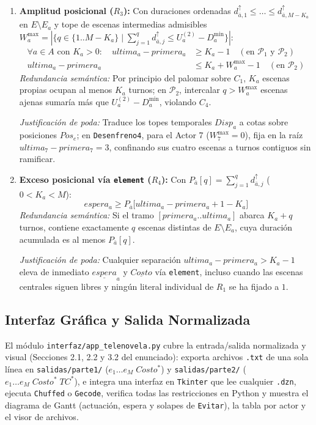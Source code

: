 \begin{enumerate}
    \item \textbf{Amplitud posicional ($R_3$):} Con duraciones ordenadas $d^{\uparrow}_{\bar{a}, 1} \le \dots \le d^{\uparrow}_{\bar{a}, M-K_a}$ en $E \setminus E_a$ y tope de escenas intermedias admisibles $W^{\max}_a = |\{q \in \{1..M-K_a\} \mid \sum_{j=1}^q d^{\uparrow}_{\bar{a}, j} \le U^{(2)}_a - D^{\min}_a\}|$:
    \begin{align}
        \forall a \in A \text{ con } K_a > 0: \quad
        ultima_a - primera_a &\ge K_a - 1 \quad (\text{en } \mathcal{P}_1 \text{ y } \mathcal{P}_2) \label{eq:r3_inf} \\
        ultima_a - primera_a &\le K_a + W^{\max}_a - 1 \quad (\text{en } \mathcal{P}_2) \label{eq:r3_amplitud}
    \end{align}
    \emph{Redundancia semántica:} Por principio del palomar sobre $C_1$, $K_a$ escenas propias ocupan al menos $K_a$ turnos; en $\mathcal{P}_2$, intercalar $q > W^{\max}_a$ escenas ajenas sumaría más que $U^{(2)}_a - D^{\min}_a$, violando $C_4$.\par
    \emph{Justificación de poda:} Traduce los topes temporales $Disp_a$ a cotas sobre posiciones $Pos_e$; en \texttt{Desenfreno4}, para el Actor 7 ($W^{\max}_7 = 0$), fija en la raíz $ultima_7 - primera_7 = 3$, confinando sus cuatro escenas a turnos contiguos sin ramificar.

    \item \textbf{Exceso posicional vía \texttt{element} ($R_4$):} Con $P_{\bar{a}}[q] = \sum_{j=1}^q d^{\uparrow}_{\bar{a}, j}$ ($0 < K_a < M$):
    \begin{equation}
        espera_a \ge P_{\bar{a}}\big[ultima_a - primera_a + 1 - K_a\big]
        \label{eq:r4_exceso}
    \end{equation}
    \emph{Redundancia semántica:} Si el tramo $[primera_a .. ultima_a]$ abarca $K_a + q$ turnos, contiene exactamente $q$ escenas distintas de $E \setminus E_a$, cuya duración acumulada es al menos $P_{\bar{a}}[q]$.\par
    \emph{Justificación de poda:} Cualquier separación $ultima_a - primera_a > K_a - 1$ eleva de inmediato $\underline{espera}_a$ y $\underline{Costo}$ vía \texttt{element}, incluso cuando las escenas centrales siguen libres y ningún literal individual de $R_1$ se ha fijado a $1$.
\end{enumerate}

\subsection{Interfaz Gráfica y Salida Normalizada}

El módulo \nolinkurl{interfaz/app_telenovela.py} cubre la entrada/salida normalizada y visual (Secciones 2.1, 2.2 y 3.2 del enunciado): exporta archivos \texttt{.txt} de una sola línea en \nolinkurl{salidas/parte1/} ($e_1 \dots e_M\; Costo^*$) y \nolinkurl{salidas/parte2/} ($e_1 \dots e_M\; Costo^*\; TC^*$), e integra una interfaz en \texttt{Tkinter} que lee cualquier \texttt{.dzn}, ejecuta \texttt{Chuffed} o \texttt{Gecode}, verifica todas las restricciones en Python y muestra el diagrama de Gantt (actuación, espera y solapes de \texttt{Evitar}), la tabla por actor y el visor de archivos.
